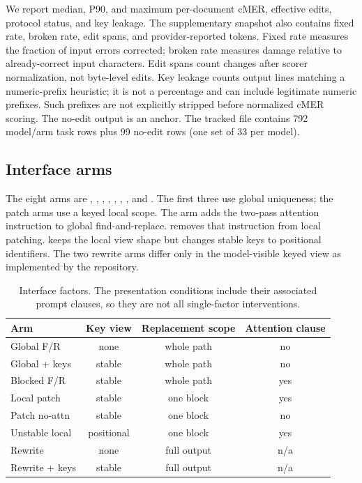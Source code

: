 \documentclass{article}
\begin{document}
We report median, P90, and maximum per-document cMER, effective edits, protocol status, and key leakage. The supplementary snapshot also contains fixed rate, broken rate, edit spans, and provider-reported tokens. Fixed rate measures the fraction of input errors corrected; broken rate measures damage relative to already-correct input characters. Edit spans count changes after scorer normalization, not byte-level edits. Key leakage counts output lines matching a numeric-prefix heuristic; it is not a percentage and can include legitimate numeric prefixes. Such prefixes are not explicitly stripped before normalized cMER scoring. The no-edit output is an anchor. The tracked file  contains 792 model/arm task rows plus 99 no-edit rows (one set of 33 per model).

\subsection{Interface arms}
The eight arms are , , , , , , , and . The first three use global uniqueness; the patch arms use a keyed local scope. The  arm adds the two-pass attention instruction to global find-and-replace.  removes that instruction from local patching.  keeps the local view shape but changes stable keys to positional identifiers. The two rewrite arms differ only in the model-visible keyed view as implemented by the repository.

\begin{table}[t]
\centering\small
\caption{Interface factors. The presentation conditions include their associated prompt clauses, so they are not all single-factor interventions.}
\label{tab:arms}
\begin{tabular}{lccc}
\toprule
Arm & Key view & Replacement scope & Attention clause\\
\midrule
Global F/R & none & whole path & no\\
Global + keys & stable & whole path & no\\
Blocked F/R & stable & whole path & yes\\
Local patch & stable & one block & yes\\
Patch no-attn & stable & one block & no\\
Unstable local & positional & one block & yes\\
Rewrite & none & full output & n/a\\
Rewrite + keys & stable & full output & n/a\\
\bottomrule
\end{tabular}
\end{table}
\end{document}
